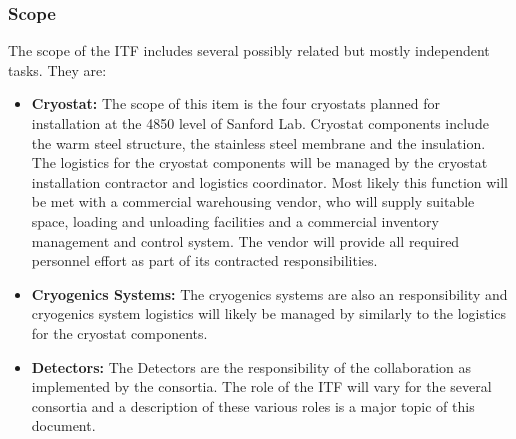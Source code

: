 \subsubsection{Scope}
The scope of the ITF includes several possibly related but mostly
independent tasks. They are:
\begin{itemize}
\item{\bf Cryostat:} The scope of this item is the four cryostats
  planned for installation at the 4850 level of Sanford Lab. Cryostat
  components include the warm steel structure, the stainless steel
  membrane and the insulation. The logistics for the cryostat
  components will be managed by the cryostat installation contractor
  and  logistics coordinator.  Most likely this function
  will be met with a commercial warehousing vendor, who will supply
  suitable space, loading and unloading facilities and a commercial
  inventory management and control system. The vendor will provide all
  required personnel effort as part of its contracted
  responsibilities.
\item{\bf Cryogenics Systems:} The cryogenics systems are also an 
  responsibility and cryogenics system logistics will likely be
  managed by  similarly to the logistics for the cryostat
  components.
\item{\bf {} Detectors:} The  Detectors are the
  responsibility of the collaboration as implemented by the
  consortia. The role of the ITF will vary for the several consortia
  and a description of these various roles is a major topic of this
  document.
\end{itemize}

